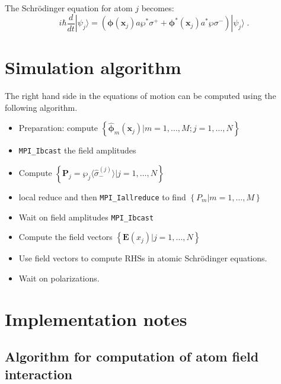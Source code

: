 \documentclass[aps, superscriptaddress, groupedaddress, preprint]{revtex4}
\renewcommand\vec{\mathbf}
\begin{document}
The Schr\"odinger equation for atom $j$ becomes:
\begin{equation}
  i\hbar\frac{d}{dt}|\psi_j\rangle =
  \left(
  \vec{\phi}(\vec{x}_j)a\wp^*\sigma^+ +
  \vec{\phi}^*(\vec{x}_j)a^*\wp\sigma^-
  \right)|\psi_j\rangle\;.
\end{equation}


\section{Simulation algorithm}

The right hand side in the equations of motion can be computed
using the following algorithm.
\begin{itemize}

\item Preparation: compute
  $\left\{\vec{\hat \phi}_m(\vec{x}_j)|
  m = 1,\ldots,M; j = 1,\ldots,N\right\}$

\item \verb!MPI_Ibcast! the field amplitudes

\item Compute 
  $\left\{\vec{P}_j=\wp_j\langle\hat\sigma_-^{(j)}\rangle |
  j = 1,\ldots,N\right\}$

\item local reduce and then \verb!MPI_Iallreduce! to find
  $\left\{P_m|m=1,\ldots,M\right\}$

\item Wait on field amplitudes \verb!MPI_Ibcast!

\item Compute the field vectors
  $\left\{\vec{E}(x_j)|j=1,\ldots,N\right\}$

\item Use field vectors to compute RHSs in atomic Schr\"odinger
  equations.

\item Wait on polarizations.

\end{itemize}

\section{Implementation notes}


\subsection{Algorithm for computation of atom field interaction}
\end{document}
